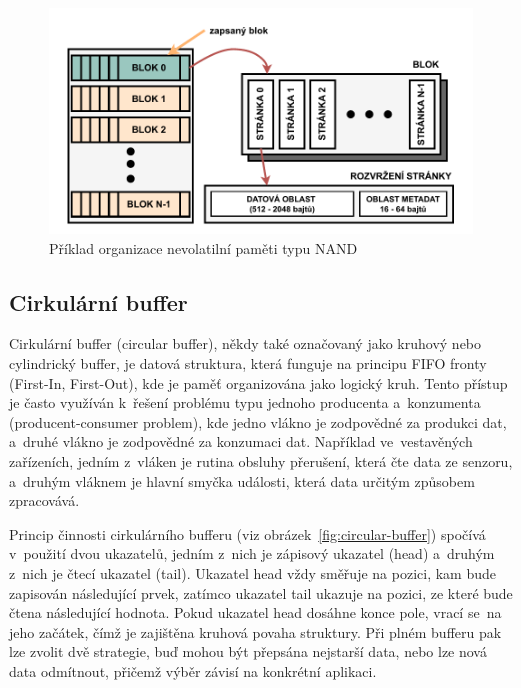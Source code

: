 \begin{figure}[h]
    \centering
    \includegraphics[width=1.00\textwidth]{obrazky-figures/nand-architecture-1.pdf}
    
    \caption{Příklad organizace nevolatilní paměti typu NAND~\cite{nand_flash_structure}}
    \label{fig:batch-processing}
\end{figure}

\newpage

\subsection{Cirkulární buffer}
\label{cirkularni_buffer}
Cirkulární buffer (circular buffer), někdy také označovaný jako kruhový nebo cylindrický buffer, je datová struktura, která funguje na principu FIFO fronty (First-In, First-Out), kde je paměť organizována jako logický kruh. Tento přístup je často využíván k~řešení problému typu jednoho producenta a~konzumenta (producent-consumer problem), kde jedno vlákno je zodpovědné za produkci dat, a~druhé vlákno je zodpovědné za konzumaci dat. Například ve~vestavěných zařízeních, jedním z~vláken je rutina obsluhy přerušení, která čte data ze senzoru, a~druhým vláknem je hlavní smyčka události, která data určitým způsobem zpracovává.~\cite{embedjournal_ring_buffer}

Princip činnosti cirkulárního bufferu (viz obrázek~\ref{fig:circular-buffer}) spočívá v~použití dvou ukazatelů, jedním z~nich je zápisový ukazatel (head) a~druhým z~nich je čtecí ukazatel (tail). Ukazatel head vždy směřuje na pozici, kam bude zapisován následující prvek, zatímco ukazatel tail ukazuje na pozici, ze které bude čtena následující hodnota. Pokud ukazatel head dosáhne konce pole, vrací se~na jeho začátek, čímž je zajištěna kruhová povaha struktury. Při plném bufferu pak lze zvolit dvě strategie, buď mohou být přepsána nejstarší data, nebo lze nová data odmítnout, přičemž výběr závisí na konkrétní aplikaci.~\cite{embedjournal_ring_buffer, medium_ring_buffer}

